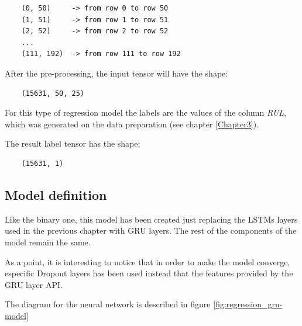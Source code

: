 \begin{verbatim}
    (0, 50)     -> from row 0 to row 50
    (1, 51)     -> from row 1 to row 51
    (2, 52)     -> from row 2 to row 52
    ...
    (111, 192)  -> from row 111 to row 192
\end{verbatim}

After the pre-processing, the input tensor will have the shape:

\begin{verbatim}
    (15631, 50, 25)
\end{verbatim}

For this type of regression model the labels are the values of the column \textit{RUL}, which was generated on the data preparation (see chapter \ref{Chapter3}).

The result label tensor has the shape:

\begin{verbatim}
    (15631, 1)
\end{verbatim}


\subsection{Model definition}

Like the binary one, this model has been created just replacing the LSTMs layers used in the previous chapter with GRU layers. The rest of the components of the model remain the same.

As a point, it is interesting to notice that in order to make the model converge, especific Dropout layers has been used instead that the features provided by the GRU layer API.

The diagram for the neural network is described in figure \ref{fig:regression_gru-model}

